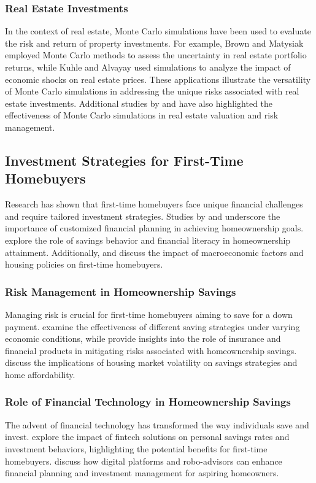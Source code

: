 \subsubsection{Real Estate Investments}
In the context of real estate, Monte Carlo simulations have been used to evaluate the risk and return of property investments. For example, Brown and Matysiak \citep{brown2000real} employed Monte Carlo methods to assess the uncertainty in real estate portfolio returns, while Kuhle and Alvayay \citep{kuhle2021economic} used simulations to analyze the impact of economic shocks on real estate prices. These applications illustrate the versatility of Monte Carlo simulations in addressing the unique risks associated with real estate investments. Additional studies by \citet{case2003dynamic} and \citet{ling2009real} have also highlighted the effectiveness of Monte Carlo simulations in real estate valuation and risk management.

\subsection{Investment Strategies for First-Time Homebuyers}
Research has shown that first-time homebuyers face unique financial challenges and require tailored investment strategies. Studies by \citet{brueckner2012strategic} and \citet{dietz2003effects} underscore the importance of customized financial planning in achieving homeownership goals. \citet{lee2013savings} explore the role of savings behavior and financial literacy in homeownership attainment. Additionally, \citet{goodman2018accessing} and \citet{mcwilliams2017assessing} discuss the impact of macroeconomic factors and housing policies on first-time homebuyers.

\subsubsection{Risk Management in Homeownership Savings}
Managing risk is crucial for first-time homebuyers aiming to save for a down payment. \citet{baker2010down} examine the effectiveness of different saving strategies under varying economic conditions, while \citet{mason2013risk} provide insights into the role of insurance and financial products in mitigating risks associated with homeownership savings. \citet{rosen2005housing} discuss the implications of housing market volatility on savings strategies and home affordability.

\subsubsection{Role of Financial Technology in Homeownership Savings}
The advent of financial technology has transformed the way individuals save and invest. \citet{phillips2019fintech} explore the impact of fintech solutions on personal savings rates and investment behaviors, highlighting the potential benefits for first-time homebuyers. \citet{gomber2018digital} discuss how digital platforms and robo-advisors can enhance financial planning and investment management for aspiring homeowners.

